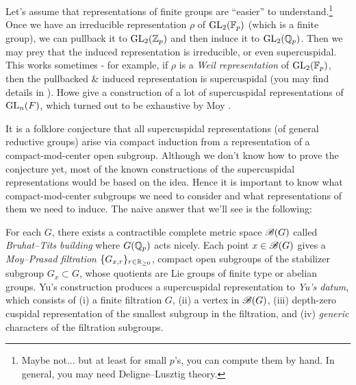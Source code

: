 \begin{center}
\end{center}
Let's assume that representations of finite groups are ``easier'' to understand.\footnote{Maybe not... but at least for small $p$'s, you can compute them by hand. In general, you may need Deligne--Lusztig theory.}
Once we have an irreducible representation $\rho$ of $\mathrm{GL}_2(\mathbb{F}_p)$ (which is a finite group), we can pullback it to $\mathrm{GL}_2(\mathbb{Z}_p)$ and then induce it to $\mathrm{GL}_2(\mathbb{Q}_p)$.
Then we may prey that the induced representation is irreducible, or even supercuspidal.
This works sometimes - for example, if $\rho$ is a \emph{Weil representation} of $\mathrm{GL}_2(\mathbb{F}_p)$, then the pullbacked \& induced representation is supercuspidal (you may find details in \cite[Chapter 4]{bump1998automorphic}).
Howe \cite{howe1977tamely} give a construction of a lot of supercuspidal representations of $\mathrm{GL}_n(F)$, which turned out to be exhaustive by Moy \cite{moy1986local}.


It is a folklore conjecture that all supercuspidal representations (of general reductive groups) arise via compact induction from a representation of a compact-mod-center open subgroup.
Although we don't know how to prove the conjecture yet, most of the known constructions of the supercuspidal representations would be based on the idea.
Hence it is important to know what compact-mod-center subgroups we need to consider and what representations of them we need to induce.
The naive answer that we'll see is the following:

\bigskip
\begin{myquote}
For each $G$, there exists a contractible complete metric space $\mathscr{B}(G)$ called \emph{Bruhat--Tits building} where $G(\mathbb{Q}_p)$ acts nicely. Each point $x \in \mathscr{B}(G)$ gives a \emph{Moy--Prasad filtration} $\{G_{x, r}\}_{r \in \mathbb{R}_{\ge 0}}$, compact open subgroups of the stabilizer subgroup $G_{x} \subset G$, whose quotients are Lie groups of finite type or abelian groups.
Yu's construction produces a supercuspidal representation to \emph{Yu's datum}, which consists of (i) a finite filtration $G$, (ii) a vertex in $\mathscr{B}(G)$, (iii) depth-zero cuspidal representation of the smallest subgroup in the filtration, and (iv) \emph{generic} characters of the filtration subgroups.
\end{myquote}



